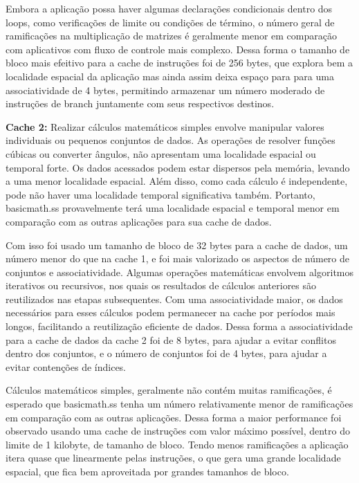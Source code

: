 \documentclass[12pt]{article}
\begin{document}
Embora a aplicação possa haver algumas declarações condicionais dentro dos loops, como verificações de limite ou condições de término, o número geral de ramificações na multiplicação de matrizes é geralmente menor em comparação com aplicativos com fluxo de controle mais complexo. Dessa forma o tamanho de bloco mais efeitivo para a cache de instruções foi de 256 bytes, que explora bem a localidade espacial da aplicação mas ainda assim deixa espaço para para uma associatividade de 4 bytes, permitindo armazenar um número moderado de instruções de branch juntamente com seus respectivos destinos.

\textbf{Cache 2:}
Realizar cálculos matemáticos simples envolve manipular valores individuais ou pequenos conjuntos de dados. As operações de resolver funções cúbicas ou converter ângulos, não apresentam uma localidade espacial ou temporal forte. Os dados acessados podem estar dispersos pela memória, levando a uma menor localidade espacial. Além disso, como cada cálculo é independente, pode não haver uma localidade temporal significativa também. Portanto, basicmath.ss provavelmente terá uma localidade espacial e temporal menor em comparação com as outras aplicações para sua cache de dados.

Com isso foi usado um tamanho de bloco de 32 bytes para a cache de dados, um número menor do que na cache 1, e foi mais valorizado os aspectos de número de conjuntos e associatividade. Algumas operações matemáticas envolvem algoritmos iterativos ou recursivos, nos quais os resultados de cálculos anteriores são reutilizados nas etapas subsequentes. Com uma associatividade maior, os dados necessários para esses cálculos podem permanecer na cache por períodos mais longos, facilitando a reutilização eficiente de dados. Dessa forma a associatividade para a cache de dados da cache 2 foi de 8 bytes, para ajudar a evitar conflitos dentro dos conjuntos, e o número de conjuntos foi de 4 bytes, para ajudar a evitar contenções de índices.

Cálculos matemáticos simples, geralmente não contém muitas ramificações, é esperado que basicmath.ss tenha um número relativamente menor de ramificações em comparação com as outras aplicações. Dessa forma a maior performance foi observado usando uma cache de instruções com valor máximo possível, dentro do limite de 1 kilobyte, de tamanho de bloco. Tendo menos ramificações a aplicação itera quase que linearmente pelas instruções, o que gera uma grande localidade espacial, que fica bem aproveitada por grandes tamanhos de bloco.
\end{document}
